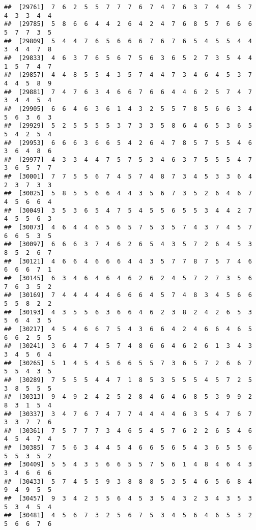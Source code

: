 \documentclass[
]{book}
\begin{document}
\begin{verbatim}
##  [29761]  7  6  2  5  5  7  7  7  6  7  4  7  6  3  7  4  4  5  7  4  3  3  4  4
##  [29785]  5  8  6  6  4  4  2  6  4  2  4  7  6  8  5  7  6  6  6  5  7  7  3  5
##  [29809]  5  4  4  7  6  5  6  6  6  7  6  7  6  5  4  5  5  4  4  3  4  4  7  8
##  [29833]  4  6  3  7  6  5  6  7  5  6  3  6  5  2  7  3  5  4  4  1  5  7  4  7
##  [29857]  4  4  8  5  5  4  3  5  7  4  4  7  3  4  6  4  5  3  7  4  4  5  8  9
##  [29881]  7  4  7  6  3  4  6  6  7  6  6  4  4  6  2  5  7  4  7  3  4  4  5  4
##  [29905]  6  6  4  6  3  6  1  4  3  2  5  5  7  8  5  6  6  3  4  5  6  3  6  3
##  [29929]  5  2  5  5  5  5  3  7  3  3  5  8  6  4  6  5  3  6  5  5  4  2  5  4
##  [29953]  6  6  6  3  6  6  5  4  2  6  4  7  8  5  7  5  5  4  6  3  6  4  8  6
##  [29977]  4  3  3  4  4  7  5  7  5  3  4  6  3  7  5  5  5  4  7  3  6  5  7  7
##  [30001]  7  7  5  5  6  7  4  5  7  4  8  7  3  4  5  3  3  6  4  2  3  7  3  3
##  [30025]  5  8  5  5  6  6  4  4  3  5  6  7  3  5  2  6  4  6  7  4  5  6  6  4
##  [30049]  3  5  3  6  5  4  7  5  4  5  5  6  5  5  3  4  4  2  7  4  5  5  6  3
##  [30073]  4  6  4  4  6  5  6  5  7  5  3  5  7  4  3  7  4  5  7  6  6  5  3  5
##  [30097]  6  6  6  3  7  4  6  2  6  5  4  3  5  7  2  6  4  5  3  8  5  2  6  7
##  [30121]  4  6  6  4  6  6  6  4  4  3  5  7  7  8  7  5  7  4  6  6  6  6  7  1
##  [30145]  6  3  4  6  4  6  4  6  2  6  2  4  5  7  2  7  3  5  6  7  6  3  5  2
##  [30169]  7  4  4  4  4  4  6  6  6  4  5  7  4  8  3  4  5  6  6  5  5  8  2  2
##  [30193]  4  3  5  5  6  3  6  6  4  6  2  3  8  2  4  2  6  5  3  5  6  4  3  5
##  [30217]  4  5  4  6  6  7  5  4  3  6  6  4  2  4  6  6  4  6  5  6  6  2  5  5
##  [30241]  3  6  4  7  4  5  7  4  8  6  6  4  6  2  6  1  3  4  3  3  4  5  6  4
##  [30265]  5  1  4  5  4  5  6  6  5  5  7  3  6  5  7  2  6  6  7  5  5  4  3  5
##  [30289]  7  5  5  5  4  4  7  1  8  5  3  5  5  5  4  5  7  2  5  3  8  5  5  5
##  [30313]  9  4  9  2  4  2  5  2  8  4  6  4  6  8  5  3  9  9  2  8  3  1  5  4
##  [30337]  3  4  7  6  7  4  7  7  4  4  4  4  6  3  5  4  7  6  7  3  3  7  7  6
##  [30361]  7  5  7  7  7  3  4  6  5  4  5  7  6  2  2  6  5  4  6  4  5  4  7  4
##  [30385]  7  5  6  3  4  4  5  4  6  6  5  6  5  4  3  6  5  5  6  5  5  3  5  2
##  [30409]  5  5  4  3  5  6  6  5  5  7  5  6  1  4  8  4  6  4  3  3  4  6  6  6
##  [30433]  5  7  4  5  5  9  3  8  8  8  5  3  5  4  6  5  6  8  4  9  4  9  5  5
##  [30457]  9  3  4  2  5  5  6  4  5  3  5  4  3  2  3  4  3  5  3  5  3  4  5  4
##  [30481]  4  5  6  7  3  2  5  6  7  5  3  4  5  6  4  6  5  3  2  5  6  6  7  6

\end{verbatim}
\end{document}
